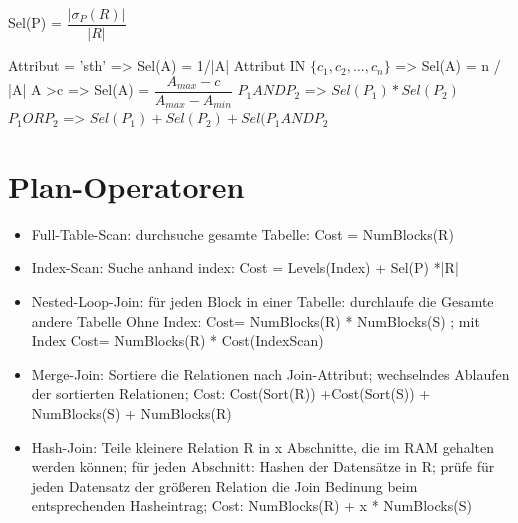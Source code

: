 Sel(P) = $\dfrac{|\sigma_P(R)|}{|R|}$

Attribut = 'sth' => Sel(A) = 1/|A|
Attribut IN $\{c_1,c_2, \dots , c_n\}$ => Sel(A) = n / |A|
A >c => Sel(A) = $\dfrac{A_{max} -c }{A_{max} - A_{min}}$
$P_1 AND P_2$ => $Sel(P_1)*Sel(P_2)$
$P_1 OR P_2$ => $Sel(P_1) + Sel(P_2) + Sel(P_1 AND P_2$

\section*{Plan-Operatoren}
\begin{itemize}
\item Full-Table-Scan: durchsuche gesamte Tabelle: Cost = NumBlocks(R)
\item Index-Scan: Suche anhand index: Cost = Levels(Index) + Sel(P) *|R|
\item Nested-Loop-Join: für jeden Block in einer Tabelle: durchlaufe die Gesamte andere Tabelle
Ohne Index: Cost= NumBlocks(R) * NumBlocks(S) ; mit Index Cost= NumBlocks(R) * Cost(IndexScan)
\item Merge-Join: Sortiere die Relationen nach Join-Attribut; wechselndes Ablaufen der sortierten Relationen;
Cost: Cost(Sort(R)) +Cost(Sort(S)) + NumBlocks(S) + NumBlocks(R)
\item Hash-Join: Teile kleinere Relation R in x Abschnitte, die im RAM gehalten werden können; für jeden Abschnitt: Hashen der Datensätze in R; prüfe für jeden Datensatz der größeren Relation die Join Bedinung beim entsprechenden Hasheintrag; Cost: NumBlocks(R) + x * NumBlocks(S)

\end{itemize}